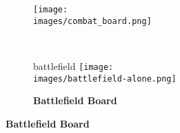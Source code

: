 \vspace*{-1em}
\begin{figure}[H]
  \centering
  \begin{subfigure}[b]{0.4\linewidth}
    \texttt{[image: \\images/combat\_board.png]}
    \caption{\textbf{}}
  \end{subfigure}
  \hspace*{5em}
  ~
  \begin{subfigure}[b]{0.3\linewidth}
    \begin{expansion}{battlefield}
      \texttt{[image: \\images/battlefield-alone.png]}
      \caption{\textbf{Battlefield Board}}
    \end{expansion}
  \end{subfigure}
\end{figure}

